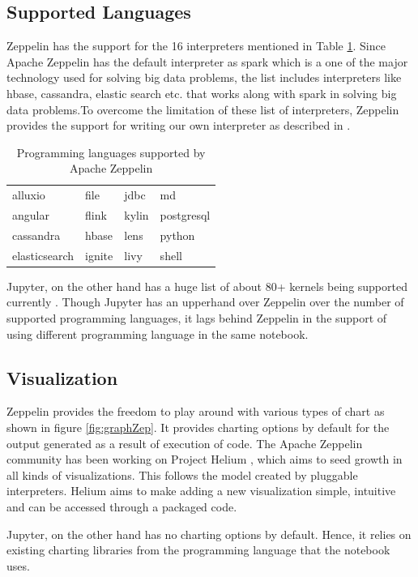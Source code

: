 \documentclass[9pt,twocolumn,twoside]{../../styles/osajnl}
\begin{document}
\subsection{Supported Languages}
Zeppelin has the support for the 16 interpreters mentioned in Table \ref{langsupport}. Since Apache Zeppelin has the default interpreter as spark which is a one of the major technology used for solving big data problems, the list includes interpreters like hbase, cassandra, elastic search etc. that works along with spark in solving big data problems.To overcome the limitation of these list of interpreters, Zeppelin provides the support for writing our own interpreter as described in \cite{www-zeppelin-int-own}. 

\begin{table}[hbt]
\caption{Programming languages supported by Apache Zeppelin}
\begin{tabular}{|l|l|l|l|}
\hline
alluxio       & file   & jdbc  & md         \\
angular       & flink  & kylin & postgresql \\
cassandra     & hbase  & lens  & python     \\
elasticsearch & ignite & livy  & shell      \\ \hline
\end{tabular}
\label{langsupport}
\end{table}

Jupyter, on the other hand has a huge list of about 80+ kernels being supported currently \cite{www-jupyter-kernel}. Though Jupyter has an upperhand over Zeppelin over the number of supported programming languages, it lags behind Zeppelin in the support of using different programming language in the same notebook. 

\subsection{Visualization}
Zeppelin provides the freedom to play around with various types of chart as shown in figure \ref{fig:graphZep}. It provides charting options by default for the output generated as a result of execution of code. The Apache Zeppelin community has been working on Project Helium \cite{www-helium-wiki}, which aims to seed growth in all kinds of visualizations. This follows the model created by pluggable interpreters. Helium aims to make adding a new visualization simple, intuitive and can be accessed through a packaged code.

Jupyter, on the other hand has no charting options by default. Hence, it relies on existing charting libraries from the programming language that the notebook uses.
\end{document}
